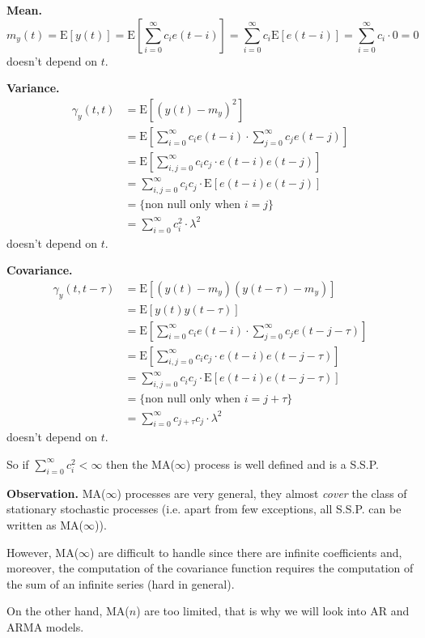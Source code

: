 \documentclass[10pt,a4paper,twoside,openright]{book}
\begin{document}
\textbf{Mean.}
\[
	m_{y}(t)=\mathrm{E}[y(t)]=\mathrm{E}\left[\sum_{i=0}^{\infty} c_{i} e(t-i)\right]=\sum_{i=0}^{\infty} c_{i} \mathrm{E}[e(t-i)]=\sum_{i=0}^{\infty} c_{i} \cdot 0=0
\]
doesn't depend on $t$.

\textbf{Variance.}
\begin{align*}
	\gamma_{y}(t, t)&=\mathrm{E}[(y(t)-m_{y})^{2}]\\
	&=\mathrm{E}\left[\sum_{i=0}^{\infty} c_{i} e(t-i) \cdot \sum_{j=0}^{\infty} c_{j} e(t-j)\right]\\
	&=\mathrm{E}\left[\sum_{i, j=0}^{\infty} c_{i} c_{j} \cdot e(t-i) e(t-j)\right]\\
	&=\sum_{i, j=0}^{\infty} c_{i} c_{j} \cdot \mathrm{E}[e(t-i) e(t-j)]\\
	&=\{\text{non null only when }i=j\}\\
	&=\sum_{i=0}^{\infty} c_{i}^2 \cdot\lambda^2 
\end{align*}
doesn't depend on $t$.

\textbf{Covariance.}
\begin{align*}
	\gamma_{y}(t, t-\tau) &=\mathrm{E}[(y(t)-m_{y}) (y(t-\tau)-m_{y})]\\
	&=\mathrm{E}[y(t) y(t-\tau)]\\
	&=\mathrm{E}\left[\sum_{i=0}^{\infty} c_{i} e(t-i) \cdot \sum_{j=0}^{\infty} c_{j} e(t-j-\tau)\right]\\
	&=\mathrm{E}\left[\sum_{i, j=0}^{\infty} c_{i} c_{j} \cdot e(t-i) e(t-j-\tau)\right]\\
	&=\sum_{i, j=0}^{\infty} c_{i} c_{j} \cdot \mathrm{E}[e(t-i) e(t-j-\tau)]\\
	&=\{\text{non null only when }i=j+\tau\}\\
	&=\sum_{i=0}^{\infty} c_{j+\tau}c_{j}\cdot\lambda^2 
\end{align*}
doesn't depend on $t$.

So if $\sum_{i=0}^{\infty} c_{i}^{2}<\infty$ then the MA($\infty $) process is well defined and is a S.S.P.

\textbf{Observation.} MA($\infty$) processes are very general, they almost \emph{cover} the class of stationary stochastic processes (i.e. apart from few exceptions, all S.S.P. can be written as MA($\infty$)).

However, MA($\infty$) are difficult to handle since there are infinite coefficients and, moreover, the computation of the covariance function requires the computation of the sum of an infinite series (hard in general).

On the other hand, MA($n$) are too limited, that is why we will look into AR and ARMA models.
\end{document}
